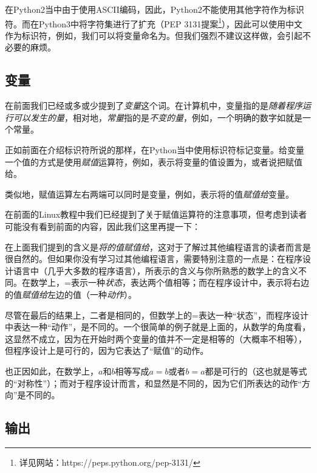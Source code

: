 \begin{extend}
    在Python2当中由于使用ASCII编码，因此，Python2不能使用其他字符作为标识符。而在Python3中将字符集进行了扩充（PEP 3131提案\footnote{详见网站：https://peps.python.org/pep-3131/}），因此可以使用中文作为标识符，例如，我们可以将变量命名为。但我们强烈不建议这样做，会引起不必要的麻烦。
\end{extend}

\subsection{变量}\label{subsec:输入与输出-变量}

在前面我们已经或多或少提到了\emph{变量}这个词。在计算机中，变量指的是\emph{随着程序运行可以发生的量}，相对地，\emph{常量}指的是\emph{不变的量}，例如，一个明确的数字如就是一个常量。

正如前面在介绍标识符所说的那样，在Python当中使用标识符标记变量。给变量一个值的方式是使用\emph{赋值}运算符\code{=}，例如，表示将变量的值设置为，或者说把赋值给。

类似地，赋值运算左右两端可以同时是变量，例如，表示将的值\emph{赋值给}变量。

\begin{attention}
    在前面的Linux教程中我们已经提到了关于赋值运算符的注意事项，但考虑到读者可能没有看到前面的内容，因此我们这里再提一下：

    在上面我们提到的含义是\emph{将的值赋值给}，这对于了解过其他编程语言的读者而言是很自然的。但如果你没有学习过其他编程语言，需要特别注意的一点是：在程序设计语言中（几乎大多数的程序语言），\code{=}所表示的含义与你所熟悉的数学上的含义不同。在数学上，=表示一种\emph{状态}，表达两个值相等；而在程序设计中，\code{=}表示将右边的值\emph{赋值给}左边的值（一种\emph{动作}）。

    尽管在最后的结果上，二者是相同的，但数学上的=表达一种“状态”，而程序设计中表达一种“动作”，是不同的。一个很简单的例子就是上面的，从数学的角度看，这显然不成立，因为在开始时两个变量的值并不一定是相等的（大概率不相等），但程序设计上是可行的，因为它表达了“赋值”的动作。

    也正因如此，在数学上，$a$和$b$相等写成$a=b$或者$b=a$都是可行的（这也就是等式的“对称性”）；而对于程序设计而言，和显然是不同的，因为它们所表达的动作“方向”是不同的。
\end{attention}

\subsection{输出}\label{subsec:输入与输出-print输出}

